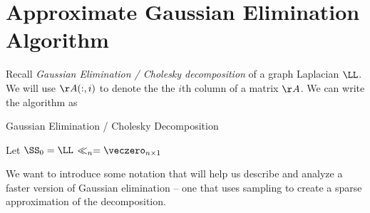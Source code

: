 \section{Approximate Gaussian Elimination Algorithm}
Recall \emph{Gaussian Elimination / Cholesky decomposition} of a graph Laplacian $\LL$.
We will use $\AA(:,i)$ to denote the the $i$th
column of a matrix $\AA$.
We can write the algorithm as

\begin{algorithm}[H]
\label{alg:ge}
\caption{Gaussian Elimination / Cholesky Decomposition}
Let $\SS_0 = \LL$ \;
$\ll_n = \veczero_{n \times 1}$\;
\;
\end{algorithm}
We want to introduce some notation that will help us describe and
analyze a faster version of Gaussian elimination -- one that uses sampling
to create a sparse approximation of the decomposition.


